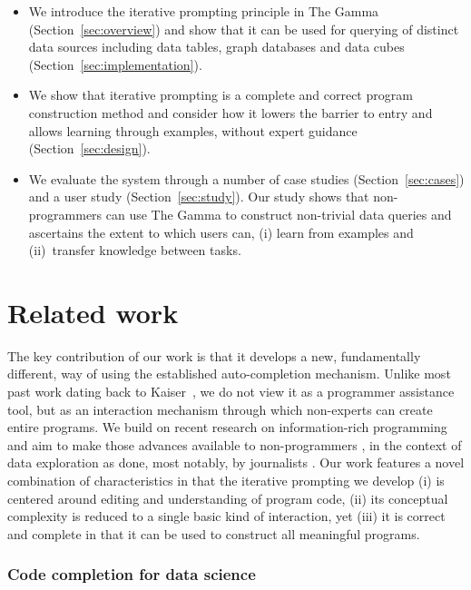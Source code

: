 \documentclass[manuscript,review,anonymous]{acmart}
\begin{document}
\begin{itemize}
\item We introduce the iterative prompting principle in The Gamma (Section~\ref{sec:overview})
  and show that it can be used for querying of distinct data sources including data tables, graph
  databases and data cubes (Section~\ref{sec:implementation}).

\item We show that iterative prompting is a complete and correct program construction method and
  consider how it lowers the barrier to entry and allows learning through examples, without
  expert guidance (Section~\ref{sec:design}).

\item We evaluate the system through a number of case studies (Section~\ref{sec:cases})
  and a user study (Section~\ref{sec:study}). Our study shows that non-programmers can use The Gamma
  to construct non-trivial data queries and ascertains the extent to which users can,
  (i) learn from examples and (ii)~transfer knowledge between tasks.
\end{itemize}


\section{Related work}

The key contribution of our work is that it develops a new, fundamentally different, way of using the
established auto-completion mechanism. Unlike most past work dating back to Kaiser~\cite{assistants},
we do not view it as a programmer assistance tool, but as an interaction mechanism through which
non-experts can create entire programs. We build on recent research on information-rich
programming \cite{inforich} and aim to make those advances available to non-programmers
\cite{enduser,smallmatter}, in the context of data exploration as done, most notably, by
journalists \cite{ddj}. Our work features a novel combination of characteristics in that
the iterative prompting we develop (i) is centered around editing and understanding of program code,
(ii) its conceptual complexity is reduced to a single basic kind of interaction, yet (iii) it is
correct and complete in that it can be used to construct all meaningful programs.

\subsubsection*{Code completion for data science}
\end{document}
